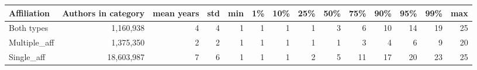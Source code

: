 \begin{tabular}{lrrrrrrrrrrrrr}
\hline
 Affiliation   &   Authors in category &   mean years &   std &   min &   1\% &   10\% &   25\% &   50\% &   75\% &   90\% &   95\% &   99\% &   max \\
\hline
 Both types    &             1,160,938 &            4 &     4 &     1 &    1 &     1 &     1 &     3 &     6 &    10 &    14 &    19 &    25 \\
 Multiple\_aff  &             1,375,350 &            2 &     2 &     1 &    1 &     1 &     1 &     1 &     3 &     4 &     6 &     9 &    20 \\
 Single\_aff    &            18,603,987 &            7 &     6 &     1 &    1 &     1 &     2 &     5 &    11 &    17 &    20 &    23 &    25 \\
\hline
\end{tabular}